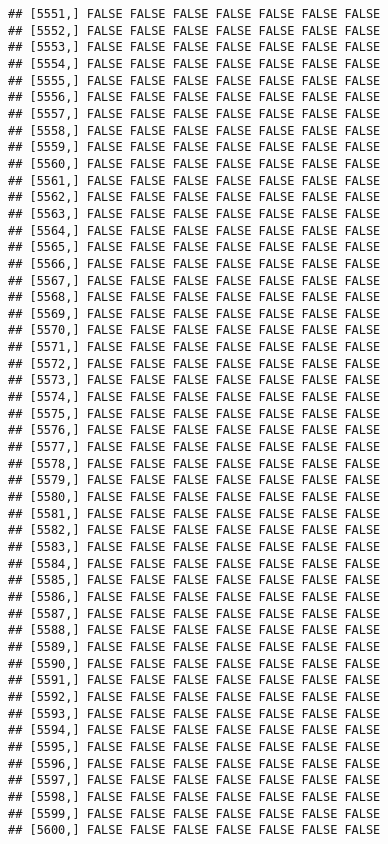 \documentclass[
]{article}
\begin{document}
\begin{verbatim}
## [5551,] FALSE FALSE FALSE FALSE FALSE FALSE FALSE
## [5552,] FALSE FALSE FALSE FALSE FALSE FALSE FALSE
## [5553,] FALSE FALSE FALSE FALSE FALSE FALSE FALSE
## [5554,] FALSE FALSE FALSE FALSE FALSE FALSE FALSE
## [5555,] FALSE FALSE FALSE FALSE FALSE FALSE FALSE
## [5556,] FALSE FALSE FALSE FALSE FALSE FALSE FALSE
## [5557,] FALSE FALSE FALSE FALSE FALSE FALSE FALSE
## [5558,] FALSE FALSE FALSE FALSE FALSE FALSE FALSE
## [5559,] FALSE FALSE FALSE FALSE FALSE FALSE FALSE
## [5560,] FALSE FALSE FALSE FALSE FALSE FALSE FALSE
## [5561,] FALSE FALSE FALSE FALSE FALSE FALSE FALSE
## [5562,] FALSE FALSE FALSE FALSE FALSE FALSE FALSE
## [5563,] FALSE FALSE FALSE FALSE FALSE FALSE FALSE
## [5564,] FALSE FALSE FALSE FALSE FALSE FALSE FALSE
## [5565,] FALSE FALSE FALSE FALSE FALSE FALSE FALSE
## [5566,] FALSE FALSE FALSE FALSE FALSE FALSE FALSE
## [5567,] FALSE FALSE FALSE FALSE FALSE FALSE FALSE
## [5568,] FALSE FALSE FALSE FALSE FALSE FALSE FALSE
## [5569,] FALSE FALSE FALSE FALSE FALSE FALSE FALSE
## [5570,] FALSE FALSE FALSE FALSE FALSE FALSE FALSE
## [5571,] FALSE FALSE FALSE FALSE FALSE FALSE FALSE
## [5572,] FALSE FALSE FALSE FALSE FALSE FALSE FALSE
## [5573,] FALSE FALSE FALSE FALSE FALSE FALSE FALSE
## [5574,] FALSE FALSE FALSE FALSE FALSE FALSE FALSE
## [5575,] FALSE FALSE FALSE FALSE FALSE FALSE FALSE
## [5576,] FALSE FALSE FALSE FALSE FALSE FALSE FALSE
## [5577,] FALSE FALSE FALSE FALSE FALSE FALSE FALSE
## [5578,] FALSE FALSE FALSE FALSE FALSE FALSE FALSE
## [5579,] FALSE FALSE FALSE FALSE FALSE FALSE FALSE
## [5580,] FALSE FALSE FALSE FALSE FALSE FALSE FALSE
## [5581,] FALSE FALSE FALSE FALSE FALSE FALSE FALSE
## [5582,] FALSE FALSE FALSE FALSE FALSE FALSE FALSE
## [5583,] FALSE FALSE FALSE FALSE FALSE FALSE FALSE
## [5584,] FALSE FALSE FALSE FALSE FALSE FALSE FALSE
## [5585,] FALSE FALSE FALSE FALSE FALSE FALSE FALSE
## [5586,] FALSE FALSE FALSE FALSE FALSE FALSE FALSE
## [5587,] FALSE FALSE FALSE FALSE FALSE FALSE FALSE
## [5588,] FALSE FALSE FALSE FALSE FALSE FALSE FALSE
## [5589,] FALSE FALSE FALSE FALSE FALSE FALSE FALSE
## [5590,] FALSE FALSE FALSE FALSE FALSE FALSE FALSE
## [5591,] FALSE FALSE FALSE FALSE FALSE FALSE FALSE
## [5592,] FALSE FALSE FALSE FALSE FALSE FALSE FALSE
## [5593,] FALSE FALSE FALSE FALSE FALSE FALSE FALSE
## [5594,] FALSE FALSE FALSE FALSE FALSE FALSE FALSE
## [5595,] FALSE FALSE FALSE FALSE FALSE FALSE FALSE
## [5596,] FALSE FALSE FALSE FALSE FALSE FALSE FALSE
## [5597,] FALSE FALSE FALSE FALSE FALSE FALSE FALSE
## [5598,] FALSE FALSE FALSE FALSE FALSE FALSE FALSE
## [5599,] FALSE FALSE FALSE FALSE FALSE FALSE FALSE
## [5600,] FALSE FALSE FALSE FALSE FALSE FALSE FALSE

\end{verbatim}
\end{document}
